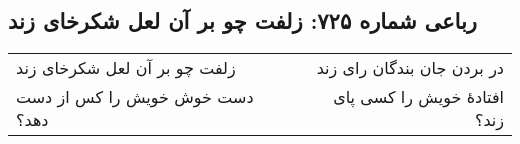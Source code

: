 \begin{center}
\section*{رباعی شماره ۷۲۵: زلفت چو بر آن لعل شکرخای زند}
\label{sec:0725}
\begin{longtable}{l p{0.5cm} r}
زلفت چو بر آن لعل شکرخای زند
&&
در بردن جان بندگان رای زند
\\
دست خوش خویش را کس از دست دهد؟
&&
افتادهٔ خویش را کسی پای زند؟
\\
\end{longtable}
\end{center}
